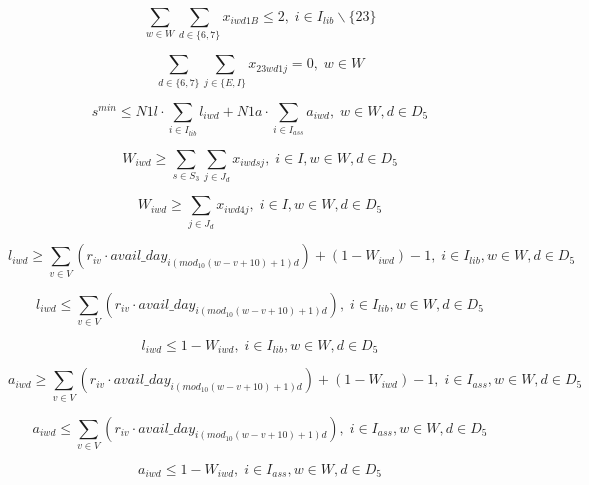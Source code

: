 \begin{equation}
\sum_{w \in W} \sum_{d \in \{6,7\}} x_{iwd1B} \leq 2, \; i \in I_{lib} \backslash \{23\}
\end{equation}

\begin{equation}
\sum_{d \in \{6,7\}} \sum_{j \in \{E,I\}} x_{23wd1j} = 0, \; w \in W
\end{equation}

\begin{equation}
s^{min} \leq N1l \cdot \sum_{i \in I_{lib}} l_{iwd} + N1a \cdot \sum_{i \in I_{ass}} a_{iwd}, \; w \in W, d \in D_5
\end{equation}

\begin{equation}
W_{iwd} \geq \sum_{s \in S_3} \sum_{j \in J_d} x_{iwdsj}, \; i \in I, w \in W, d \in D_5
\end{equation}

\begin{equation}
W_{iwd} \geq \sum_{j \in J_d} x_{iwd4j}, \; i \in I, w \in W, d \in D_5
\end{equation}

\begin{equation}
l_{iwd} \geq \sum_{v \in V} (r_{iv} \cdot avail\_day_{i(mod_{10}(w-v+10)+1)d}) + (1-W_{iwd}) - 1, \; i \in I_{lib}, w \in W, d \in D_5
\end{equation}

\begin{equation}
l_{iwd} \leq \sum_{v \in V} (r_{iv} \cdot avail\_day_{i(mod_{10}(w-v+10)+1)d}), \; i \in I_{lib}, w \in W, d \in D_5
\end{equation}

\begin{equation}
l_{iwd} \leq 1-W_{iwd}, \; i \in I_{lib}, w \in W, d \in D_5
\end{equation}

\begin{equation}
a_{iwd} \geq \sum_{v \in V} (r_{iv} \cdot avail\_day_{i(mod_{10}(w-v+10)+1)d}) + (1-W_{iwd}) - 1, \; i \in I_{ass}, w \in W, d \in D_5
\end{equation}

\begin{equation}
a_{iwd} \leq \sum_{v \in V} (r_{iv} \cdot avail\_day_{i(mod_{10}(w-v+10)+1)d}), \; i \in I_{ass}, w \in W, d \in D_5
\end{equation}

\begin{equation}
a_{iwd} \leq 1-W_{iwd}, \; i \in I_{ass}, w \in W, d \in D_5
\end{equation}

